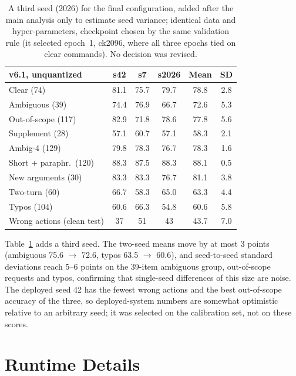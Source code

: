 \begin{table}[t]
\centering\footnotesize
\setlength{\tabcolsep}{3pt}
\begin{tabular}{@{}lccccc@{}}
\toprule
v6.1, unquantized & s42 & s7 & s2026 & Mean & SD \\
\midrule
Clear (74) & 81.1 & 75.7 & 79.7 & 78.8 & 2.8 \\
Ambiguous (39) & 74.4 & 76.9 & 66.7 & 72.6 & 5.3 \\
Out-of-scope (117) & 82.9 & 71.8 & 78.6 & 77.8 & 5.6 \\
Supplement (28) & 57.1 & 60.7 & 57.1 & 58.3 & 2.1 \\
Ambig-4 (129) & 79.8 & 78.3 & 76.7 & 78.3 & 1.6 \\
Short + paraphr.\ (120) & 88.3 & 87.5 & 88.3 & 88.1 & 0.5 \\
New arguments (30) & 83.3 & 83.3 & 76.7 & 81.1 & 3.8 \\
Two-turn (60) & 66.7 & 58.3 & 65.0 & 63.3 & 4.4 \\
Typos (104) & 60.6 & 66.3 & 54.8 & 60.6 & 5.8 \\
\midrule
Wrong actions (clean test) & 37 & 51 & 43 & 43.7 & 7.0 \\
\bottomrule
\end{tabular}
\caption{A third seed (2026) for the final configuration, added after the main analysis only to estimate seed variance;
identical data and hyper-parameters, checkpoint chosen by the same validation rule (it selected epoch~1, ck2096, where all three
epochs tied on clear commands). No decision was revised.}
\label{tab:seed3}
\end{table}

Table~\ref{tab:seed3} adds a third seed. The two-seed means move by at most 3 points (ambiguous 75.6 $\rightarrow$ 72.6, typos
63.5 $\rightarrow$ 60.6), and seed-to-seed standard deviations reach 5--6 points on the 39-item ambiguous group, out-of-scope
requests and typos, confirming that single-seed differences of this size are noise. The deployed seed 42 has the fewest wrong
actions and the best out-of-scope accuracy of the three, so deployed-system numbers are somewhat optimistic relative to an
arbitrary seed; it was selected on the calibration set, not on these scores.

\section{Runtime Details}
\label{app:runtime}

